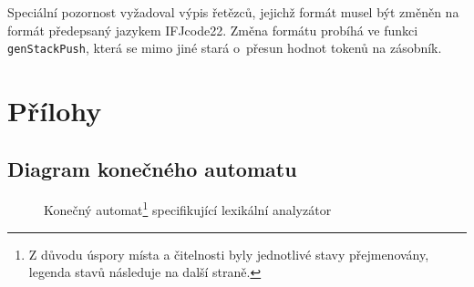 \documentclass[a4paper,12pt]{article}
\begin{document}
Speciální pozornost vyžadoval výpis řetězců, jejichž formát musel být změněn na formát předepsaný jazykem IFJcode22. Změna formátu probíhá ve funkci \verb|genStackPush|, která se mimo jiné stará o~přesun hodnot tokenů na zásobník.

\clearpage

\section{Přílohy}

\subsection{Diagram konečného automatu}

\begin{figure}[htp!]
	\centerline{}
	\begin{minipage}{\textwidth}
		\vspace{1.5em}
		\caption{Konečný automat\protect\footnote[6]{Z důvodu úspory místa a čitelnosti byly jednotlivé stavy přejmenovány, legenda stavů následuje na další straně.} specifikující lexikální analyzátor}
		\label{fig:DKA}
	\end{minipage}
\end{figure}

\clearpage
\end{document}
